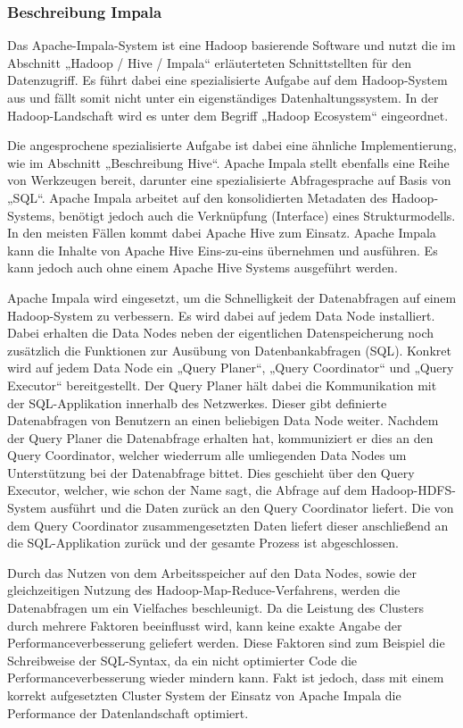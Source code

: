 \subsubsection{Beschreibung Impala}
\label{subsubsec:impala_beschreibung}
Das Apache\hyp{}Impala\hyp{}System ist eine Hadoop basierende Software und nutzt
die im Abschnitt „Hadoop / Hive / Impala“ erläuterteten Schnittstellten
für den Datenzugriff. Es führt dabei eine spezialisierte Aufgabe auf dem
Hadoop\hyp{}System aus und fällt somit nicht unter ein eigenständiges
Datenhaltungssystem. In der Hadoop\hyp{}Landschaft wird es unter dem Begriff
„Hadoop Ecosystem“ eingeordnet.

Die angesprochene spezialisierte Aufgabe ist dabei eine ähnliche
Implementierung, wie im Abschnitt „Beschreibung Hive“. Apache
Impala stellt ebenfalls eine Reihe von Werkzeugen bereit, darunter eine
spezialisierte Abfragesprache auf Basis von „\gls{SQL}“. Apache Impala arbeitet
auf den konsolidierten Metadaten des Hadoop\hyp{}Systems, benötigt jedoch auch
die Verknüpfung (Interface) eines Strukturmodells. In den meisten Fällen kommt
dabei Apache Hive zum Einsatz. Apache Impala kann die Inhalte von Apache Hive
Eins\hyp{}zu\hyp{}eins übernehmen und ausführen. Es kann jedoch auch ohne einem
Apache Hive Systems ausgeführt werden.

Apache Impala wird eingesetzt, um die Schnelligkeit der Datenabfragen auf einem
Hadoop\hyp{}System zu verbessern. Es wird dabei auf jedem Data Node
installiert. Dabei erhalten die Data Nodes neben der eigentlichen
Datenspeicherung noch zusätzlich die Funktionen zur Ausübung von
Datenbankabfragen (\gls{SQL}). Konkret wird auf jedem Data Node ein
„Query Planer“, „Query Coordinator“ und „Query Executor“ bereitgestellt. Der
Query Planer hält dabei die Kommunikation mit der \gls{SQL}\hyp{}Applikation
innerhalb des Netzwerkes. Dieser gibt definierte Datenabfragen von Benutzern an
einen beliebigen Data Node weiter. Nachdem der Query Planer die Datenabfrage
erhalten hat, kommuniziert er dies an den Query Coordinator, welcher wiederrum
alle umliegenden Data Nodes um Unterstützung bei der Datenabfrage bittet. Dies
geschieht über den Query Executor, welcher, wie schon der Name sagt, die
Abfrage auf dem Hadoop\hyp{}HDFS\hyp{}System ausführt und die Daten zurück an
den Query Coordinator liefert. Die von dem Query Coordinator zusammengesetzten
Daten liefert dieser anschließend an die \gls{SQL}\hyp{}Applikation zurück und
der gesamte Prozess ist abgeschlossen.

Durch das Nutzen von dem Arbeitsspeicher auf den Data Nodes, sowie der
gleichzeitigen Nutzung des Hadoop\hyp{}Map\hyp{}Reduce\hyp{}Verfahrens, werden
die Datenabfragen um ein Vielfaches beschleunigt. Da die Leistung des Clusters
durch mehrere Faktoren beeinflusst wird, kann keine exakte Angabe der
Performanceverbesserung geliefert werden. Diese Faktoren sind zum Beispiel die
Schreibweise der \gls{SQL}\hyp{}Syntax, da ein nicht optimierter Code die
Performanceverbesserung wieder mindern kann. Fakt ist jedoch, dass mit einem
korrekt aufgesetzten Cluster System der Einsatz von Apache Impala die
Performance der Datenlandschaft optimiert.
\nl%

